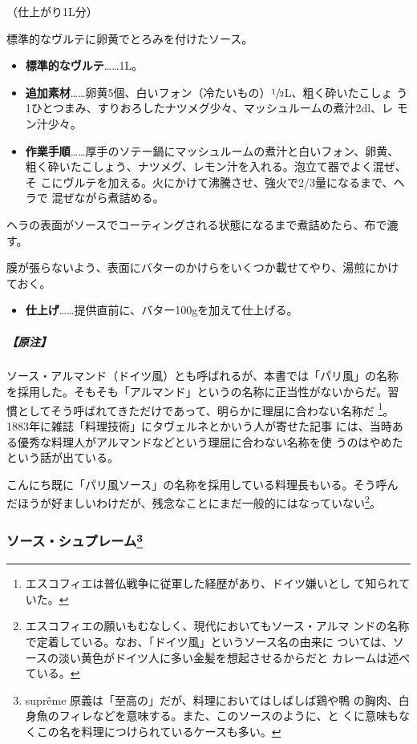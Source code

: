 （仕上がり1L分）

標準的なヴルテに卵黄でとろみを付けたソース。

\begin{itemize}
\item
  \textbf{標準的なヴルテ}\ldots{}\ldots{}1L。
\item
  \textbf{追加素材}\ldots{}\ldots{}卵黄5個、白いフォン（冷たいもの）\(\sfrac{1}{2}\)L、粗く砕いたこしょ
  う1ひとつまみ、すりおろしたナツメグ少々、マッシュルームの煮汁2dl、レ
  モン汁少々。
\item
  \textbf{作業手順}\ldots{}\ldots{}厚手のソテー鍋にマッシュルームの煮汁と白いフォン、卵黄、
  粗く砕いたこしょう、ナツメグ、レモン汁を入れる。泡立て器でよく混ぜ、そ
  こにヴルテを加える。火にかけて沸騰させ、強火で2/3量になるまで、ヘラで
  混ぜながら煮詰める。
\end{itemize}

ヘラの表面がソースでコーティングされる状態になるまで煮詰めたら、布で漉す。

膜が張らないよう、表面にバターのかけらをいくつか載せてやり、湯煎にかけ
ておく。

\begin{itemize}
\tightlist
\item
  \textbf{仕上げ}\ldots{}\ldots{}提供直前に、バター100gを加えて仕上げる。
\end{itemize}

\hypertarget{ux539fux6ce8-3}{%
\subparagraph{【原注】}\label{ux539fux6ce8-3}}

ソース・アルマンド（ドイツ風）とも呼ばれるが、本書では「パリ風」の名称
を採用した。そもそも「アルマンド」というの名称に正当性がないからだ。習
慣としてそう呼ばれてきただけであって、明らかに理屈に合わない名称だ
\footnote{エスコフィエは普仏戦争に従軍した経歴があり、ドイツ嫌いとし
  て知られていた。}。1883年に雑誌「料理技術」にタヴェルネとかいう人が寄せた記事
には、当時ある優秀な料理人がアルマンドなどという理屈に合わない名称を使
うのはやめたという話が出ている。

こんにち既に「パリ風ソース」の名称を採用している料理長もいる。そう呼ん
だほうが好ましいわけだが、残念なことにまだ一般的にはなっていない\footnote{エスコフィエの願いもむなしく、現代においてもソース・アルマ
  ンドの名称で定着している。なお、「ドイツ風」というソース名の由来に
  ついては、ソースの淡い黄色がドイツ人に多い金髪を想起させるからだと
  カレームは述べている。}。

\maeaki

\hypertarget{ux30bdux30fcux30b9ux30b7ux30e5ux30d7ux30ecux30fcux30e0102023}{%
\subsubsection[ソース・シュプレーム]{\texorpdfstring{ソース・シュプレーム\footnote{suprême
  原義は「至高の」だが、料理においてはしばしば鶏や鴨
  の胸肉、白身魚のフィレなどを意味する。また、このソースのように、と
  くに意味もなくこの名を料理につけられているケースも多い。}}{ソース・シュプレーム}}\label{ux30bdux30fcux30b9ux30b7ux30e5ux30d7ux30ecux30fcux30e0102023}}

